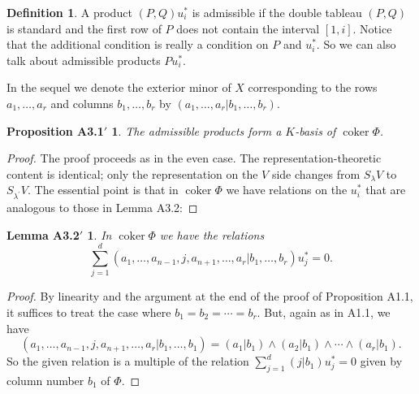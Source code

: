 \documentclass{tran-l}
\theoremstyle{plain}
\newtheorem*{theorem24}{Proposition A3.1$'$}
\newtheorem*{theorem25}{Lemma A3.2$'$}
\theoremstyle{remark}
\theoremstyle{definition}
\newtheorem*{definition5}{Definition}
\newcommand{\coker}{\operatorname{coker}}
\begin{document}
\begin{definition5} A product $(P, Q)u_{i}^{*}$ is admissible if the double
tableau $(P, Q)$ is standard and the first row of $P$ does not contain the
interval $[1,i]$. Notice that the additional condition is really a condition on
$P$ and $u_{i}^{*}$. So we can also talk about admissible products $P
u_{i}^{*}$.

In the sequel we denote the exterior minor of $X$ corresponding to
the rows $a_{1} ,\ldots ,a_{r}$ and columns $b_{1} ,\ldots ,b_{r}$ by
$(a_{1} ,\ldots ,a_{r} |b_{1} ,\ldots ,b_{r} )$.
\end{definition5}
\begin{theorem24} The admissible products form a $K$-basis of
$\coker \Phi $.
\end{theorem24}
\begin{proof} The proof proceeds as in the even case.
The representation-theoretic 
content is identical; only the representation on the $V$
side changes from $S_{\lambda }V$ to $S_{\lambda ^{\prime }}V$. 
The essential point is that in $\coker \Phi $ we have relations on
the $u_{i}^{*}$ that are analogous to those in Lemma A3.2:
\end{proof}
\begin{theorem25} In $\coker \Phi $ we have the relations
\begin{equation*}\sum _{j=1}^{d} 
(a_{1} ,\ldots ,a_{n-1} ,j, a_{n+1},\ldots ,a_{r} |
 b_{1},\ldots ,b_{r} ) u_{j}^{*} =0.
\end{equation*}
\end{theorem25}
\begin{proof} By linearity and the argument at the
end of the proof of Proposition A1.1, it suffices to treat the case where
$b_{1}=b_{2}=\cdots =b_{r}$. But, again as in A1.1, we have
\begin{equation*}(a_{1} ,\ldots ,a_{n-1} ,j, a_{n+1},\ldots ,a_{r} |
 b_{1},\ldots ,b_{1} )
=
(a_{1}|b_{1})\wedge (a_{2}|b_{1})\wedge \cdots \wedge (a_{r}|b_{1}).
\end{equation*}
So the given relation is a multiple of the relation
$\sum _{j=1}^{d} (j|b_{1} ) u_{j}^{*} =0
$
given by column number $b_{1}$ of $\Phi $.
\end{proof}
\end{document}

